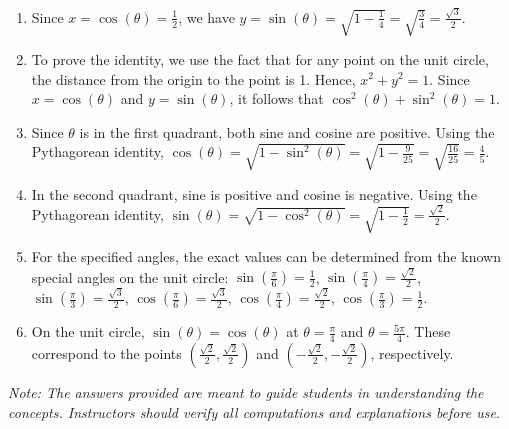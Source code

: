 \documentclass[a4paper,12pt]{book}
\begin{document}
\begin{enumerate}
    \item Since \( x = \cos(\theta) = \frac{1}{2} \), we have \( y = \sin(\theta) = \sqrt{1 - \frac{1}{4}} = \sqrt{\frac{3}{4}} = \frac{\sqrt{3}}{2} \).
    \item To prove the identity, we use the fact that for any point on the unit circle, the distance from the origin to the point is 1. Hence, \( x^2 + y^2 = 1 \). Since \( x = \cos(\theta) \) and \( y = \sin(\theta) \), it follows that \( \cos^2(\theta) + \sin^2(\theta) = 1 \).
    \item Since \( \theta \) is in the first quadrant, both sine and cosine are positive. Using the Pythagorean identity, \( \cos(\theta) = \sqrt{1 - \sin^2(\theta)} = \sqrt{1 - \frac{9}{25}} = \sqrt{\frac{16}{25}} = \frac{4}{5} \).
    \item In the second quadrant, sine is positive and cosine is negative. Using the Pythagorean identity, \( \sin(\theta) = \sqrt{1 - \cos^2(\theta)} = \sqrt{1 - \frac{1}{2}} = \frac{\sqrt{2}}{2} \).
    \item For the specified angles, the exact values can be determined from the known special angles on the unit circle: \( \sin(\frac{\pi}{6}) = \frac{1}{2} \), \( \sin(\frac{\pi}{4}) = \frac{\sqrt{2}}{2} \), \( \sin(\frac{\pi}{3}) = \frac{\sqrt{3}}{2} \), \( \cos(\frac{\pi}{6}) = \frac{\sqrt{3}}{2} \), \( \cos(\frac{\pi}{4}) = \frac{\sqrt{2}}{2} \), \( \cos(\frac{\pi}{3}) = \frac{1}{2} \).
    \item On the unit circle, \( \sin(\theta) = \cos(\theta) \) at \( \theta = \frac{\pi}{4} \) and \( \theta = \frac{5\pi}{4} \). These correspond to the points \( (\frac{\sqrt{2}}{2}, \frac{\sqrt{2}}{2}) \) and \( (-\frac{\sqrt{2}}{2}, -\frac{\sqrt{2}}{2}) \), respectively.
\end{enumerate}

\textit{Note: The answers provided are meant to guide students in understanding the concepts. Instructors should verify all computations and explanations before use.}


\pgfplotsset{compat=1.17}
\end{document}
